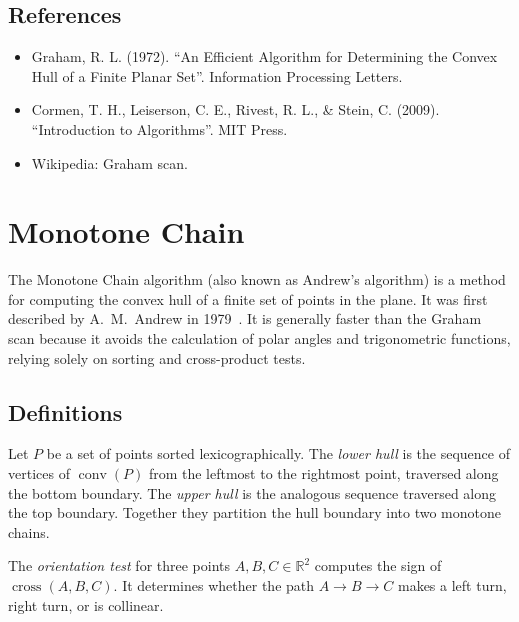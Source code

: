 \subsection{References}

\begin{itemize}
\item Graham, R. L. (1972). ``An Efficient Algorithm for Determining the Convex Hull of a Finite Planar Set''. Information Processing Letters.
\item Cormen, T. H., Leiserson, C. E., Rivest, R. L., \& Stein, C. (2009). ``Introduction to Algorithms''. MIT Press.
\item Wikipedia: Graham scan.
\end{itemize}


\section{Monotone Chain}
\label{sec:monotone_chain}

The Monotone Chain algorithm (also known as Andrew's algorithm) is a method for computing the convex hull of a finite set of points in the plane. It was first described by A.\ M.\ Andrew in 1979~\cite{andrew1979}. It is generally faster than the Graham scan because it avoids the calculation of polar angles and trigonometric functions, relying solely on sorting and cross-product tests.

\subsection{Definitions}

\begin{definition}\label{def:upper_lower_hull}
Let $P$ be a set of points sorted lexicographically. The \emph{lower hull} is the sequence of vertices of $\operatorname{conv}(P)$ from the leftmost to the rightmost point, traversed along the bottom boundary. The \emph{upper hull} is the analogous sequence traversed along the top boundary. Together they partition the hull boundary into two monotone chains.
\end{definition}

\begin{definition}\label{def:orientation_test}
The \emph{orientation test} for three points $A, B, C \in \mathbb{R}^2$ computes the sign of $\operatorname{cross}(A, B, C)$. It determines whether the path $A \to B \to C$ makes a left turn, right turn, or is collinear.
\end{definition}

